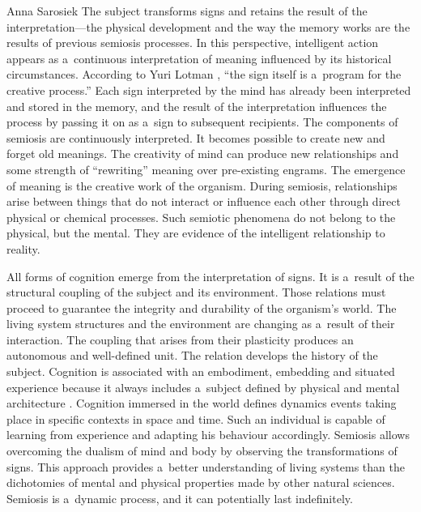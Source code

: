 \begin{artengenv}{Anna Sarosiek}
The subject transforms signs and retains the result of the interpretation---the physical development and the way the memory works are the results of previous semiosis processes. In this perspective, intelligent action appears as a~continuous interpretation of meaning influenced by its historical circumstances. According to Yuri Lotman
\parencite*[][p.101]{lotman_universe_1990}, %
 ``the sign itself is a~program for the creative process.'' Each sign interpreted by the mind has already been interpreted and stored in the memory, and the result of the interpretation influences the process by passing it on as a~sign to subsequent recipients. The components of semiosis are continuously interpreted. It becomes possible to create new and forget old meanings. The creativity of mind can produce new relationships and some strength of ``rewriting'' meaning over pre-existing engrams. The emergence of meaning is the creative work of the organism. During semiosis, relationships arise between things that do not interact or influence each other through direct physical or chemical processes. Such semiotic phenomena do not belong to the physical, but the mental. They are evidence of the intelligent relationship to reality.

All forms of cognition emerge from the interpretation of signs. It is a~result of the structural coupling of the subject and its environment. Those relations must proceed to guarantee the integrity and durability of the organism’s world. The living system structures and the environment are changing as a~result of their interaction. The coupling that arises from their plasticity produces an autonomous and well-defined unit. The relation develops the history of the subject. Cognition is associated with an embodiment, embedding and situated experience because it always includes a~subject defined by physical and mental architecture
\parencites[][]{wilson_embodied_2013}[][]{lakoff_metaphors_2008}[][]{miles_moving_2010}. %
 Cognition immersed in the world defines dynamics events taking place in specific contexts in space and time. Such an individual is capable of learning from experience and adapting his behaviour accordingly. Semiosis allows overcoming the dualism of mind and body by observing the transformations of signs. This approach provides a~better understanding of living systems than the dichotomies of mental and physical properties made by other natural sciences. Semiosis is a~dynamic process, and it can potentially last indefinitely.


\end{artengenv}
